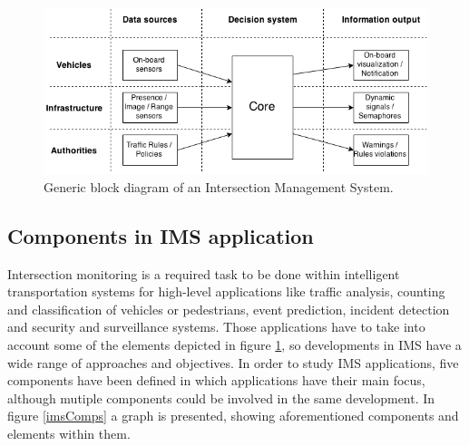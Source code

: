 
\begin{figure}[ht!]
\centering
\includegraphics[scale=0.55]{fig/2/genericIMS.png}
\caption{Generic block diagram of an Intersection Management System.}
\label{arch}
\end{figure}




\subsection{Components in IMS application}

Intersection monitoring is a required task to be done within intelligent transportation systems for high-level applications like traffic analysis, counting and classification of vehicles or pedestrians, event prediction, incident detection and security and surveillance systems. Those applications have to take into account some of the elements depicted in figure \ref{arch}, so developments in IMS have a wide range of approaches and objectives. In order to study IMS applications, five components have been defined in which applications have their main focus, although mutiple components could be involved in the same development. In figure  \ref{imsComps} a graph is presented, showing aforementioned components and elements within them.


